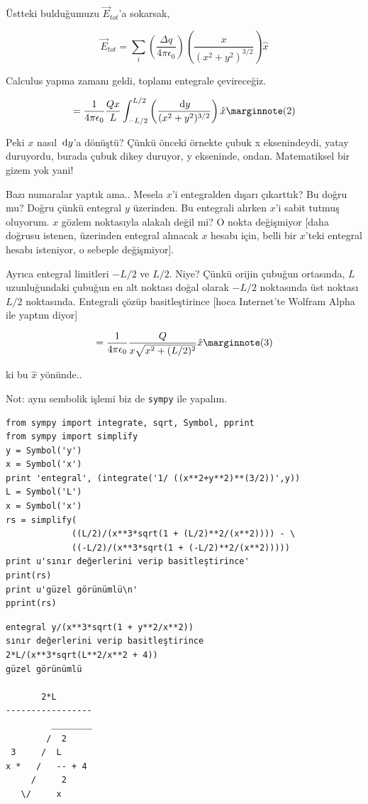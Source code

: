 \documentclass[12pt,fleqn]{article}\usepackage{../../common}
\begin{document}
Üstteki bulduğumuzu $\vec{E}_{tot}$'a sokarsak,

$$ 
\vec{E}_{tot} = \sum_i 
\left(   \frac{\Delta q}{4\pi\epsilon_0}  \right) 
  \left(\frac{x}{(x^2+y^2)^{3/2}} \right) \hat{x}
$$

Calculus yapma zamanı geldi, toplamı entegrale çevireceğiz.

$$ 
= \frac{1}{4\pi\epsilon_0} \frac{Q x}{L} \int_{-L/2}^{L/2}
\left(\frac{\ud y}{(x^2+y^2)^{3/2}} \right) \hat{x} 
\mlabel{2} 
$$

Peki $x$ nasıl $\,\mathrm{d} y$'a dönüştü? Çünkü önceki örnekte çubuk x
eksenindeydi, yatay duruyordu, burada çubuk dikey duruyor, y ekseninde,
ondan. Matematiksel bir gizem yok yani! 

Bazı numaralar yaptık ama.. Mesela $x$'i entegralden dışarı çıkarttık? Bu
doğru mu? Doğru çünkü entegral $y$ üzerinden. Bu entegrali alırken $x$'i
sabit tutmuş oluyorum. $x$ gözlem noktasıyla alakalı değil mi? O nokta
değişmiyor [daha doğrusu istenen, üzerinden entegral alınacak $x$ hesabı
için, belli bir $x$'teki entegral hesabı isteniyor, o sebeple değişmiyor]. 

Ayrıca entegral limitleri $-L/2$ ve $L/2$. Niye? Çünkü orijin çubuğun
ortasında, $L$ uzunluğundaki çubuğun en alt noktası doğal olarak $-L/2$
noktasında üst noktası $L/2$ noktasında. Entegrali çözüp basitleştirince
[hoca Internet'te Wolfram Alpha ile yaptım diyor]

$$ 
= \frac{1}{4\pi\epsilon_0} \frac{Q}{x \sqrt{x^2 + (L/2)^2}}\hat{x} 
\mlabel{3}
$$

ki bu $\hat{x}$ yönünde.. 

Not: aynı sembolik işlemi biz de \verb!sympy! ile yapalım.

\begin{verbatim}
from sympy import integrate, sqrt, Symbol, pprint
from sympy import simplify
y = Symbol('y')
x = Symbol('x')
print 'entegral', (integrate('1/ ((x**2+y**2)**(3/2))',y))
L = Symbol('L')
x = Symbol('x')
rs = simplify(
             ((L/2)/(x**3*sqrt(1 + (L/2)**2/(x**2)))) - \
             ((-L/2)/(x**3*sqrt(1 + (-L/2)**2/(x**2)))))
print u'sınır değerlerini verip basitleştirince'
print(rs)
print u'güzel görünümlü\n'
pprint(rs)
\end{verbatim}

\begin{verbatim}
entegral y/(x**3*sqrt(1 + y**2/x**2))
sınır değerlerini verip basitleştirince
2*L/(x**3*sqrt(L**2/x**2 + 4))
güzel görünümlü

       2*L       
-----------------
         ________
        /  2     
 3     /  L      
x *   /   -- + 4 
     /     2     
   \/     x      
\end{verbatim}
\end{document}
